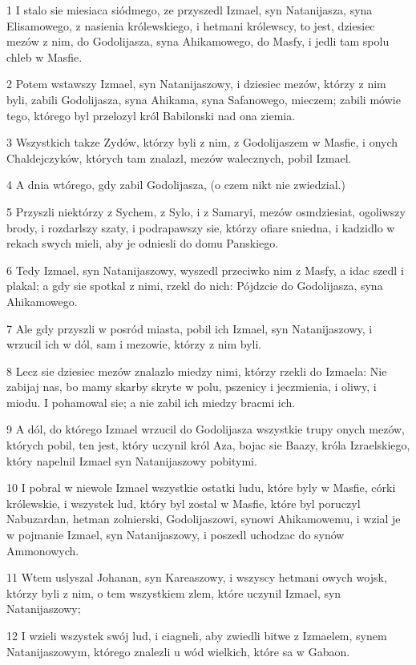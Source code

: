 \par 1 I stalo sie miesiaca siódmego, ze przyszedl Izmael, syn Natanijasza, syna Elisamowego, z nasienia królewskiego, i hetmani królewscy, to jest, dziesiec mezów z nim, do Godolijasza, syna Ahikamowego, do Masfy, i jedli tam spolu chleb w Masfie.
\par 2 Potem wstawszy Izmael, syn Natanijaszowy, i dziesiec mezów, którzy z nim byli, zabili Godolijasza, syna Ahikama, syna Safanowego, mieczem; zabili mówie tego, którego byl przelozyl król Babilonski nad ona ziemia.
\par 3 Wszystkich takze Zydów, którzy byli z nim, z Godolijaszem w Masfie, i onych Chaldejczyków, których tam znalazl, mezów walecznych, pobil Izmael.
\par 4 A dnia wtórego, gdy zabil Godolijasza, (o czem nikt nie zwiedzial.)
\par 5 Przyszli niektórzy z Sychem, z Sylo, i z Samaryi, mezów osmdziesiat, ogoliwszy brody, i rozdarlszy szaty, i podrapawszy sie, którzy ofiare sniedna, i kadzidlo w rekach swych mieli, aby je odniesli do domu Panskiego.
\par 6 Tedy Izmael, syn Natanijaszowy, wyszedl przeciwko nim z Masfy, a idac szedl i plakal; a gdy sie spotkal z nimi, rzekl do nich: Pójdzcie do Godolijasza, syna Ahikamowego.
\par 7 Ale gdy przyszli w posród miasta, pobil ich Izmael, syn Natanijaszowy, i wrzucil ich w dól, sam i mezowie, którzy z nim byli.
\par 8 Lecz sie dziesiec mezów znalazlo miedzy nimi, którzy rzekli do Izmaela: Nie zabijaj nas, bo mamy skarby skryte w polu, pszenicy i jeczmienia, i oliwy, i miodu. I pohamowal sie; a nie zabil ich miedzy bracmi ich.
\par 9 A dól, do którego Izmael wrzucil do Godolijasza wszystkie trupy onych mezów, których pobil, ten jest, który uczynil król Aza, bojac sie Baazy, króla Izraelskiego, który napelnil Izmael syn Natanijaszowy pobitymi.
\par 10 I pobral w niewole Izmael wszystkie ostatki ludu, które byly w Masfie, córki królewskie, i wszystek lud, który byl zostal w Masfie, które byl poruczyl Nabuzardan, hetman zolnierski, Godolijaszowi, synowi Ahikamowemu, i wzial je w pojmanie Izmael, syn Natanijaszowy, i poszedl uchodzac do synów Ammonowych.
\par 11 Wtem uslyszal Johanan, syn Kareaszowy, i wszyscy hetmani owych wojsk, którzy byli z nim, o tem wszystkiem zlem, które uczynil Izmael, syn Natanijaszowy;
\par 12 I wzieli wszystek swój lud, i ciagneli, aby zwiedli bitwe z Izmaelem, synem Natanijaszowym, którego znalezli u wód wielkich, które sa w Gabaon.
